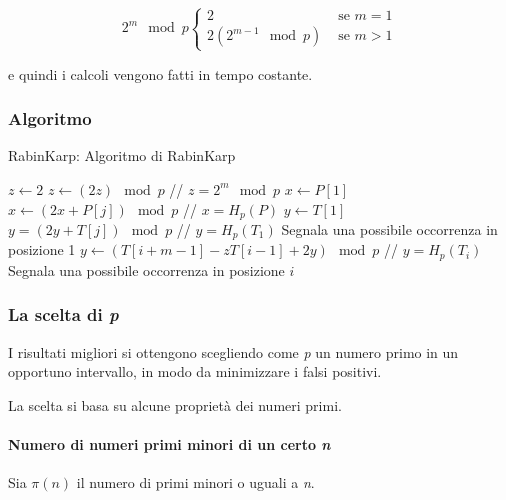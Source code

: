 $$
2^m \mod p  \begin{cases}
2 &\text{ se } m = 1\\
2 (2^{m-1} \mod p) & \text{ se } m > 1
\end{cases}
$$

e quindi i calcoli vengono fatti in tempo costante.

\subsubsection{Algoritmo}\label{algortimo}

\begin{breakablealgorithm}
	\caption{RabinKarp: Algoritmo di RabinKarp}
	\begin{algorithmic}[1]
    \State $z \gets 2$
        \State $ z \gets (2z) \mod p$
    \EndFor
    \State // $ z = 2^m \mod p$
    \State $ x \gets P[1]$
        \State $ x \gets (2x + P[j]) \mod p$
    \EndFor
    \State // $x = H_p(P)$
    \State $y \gets T[1]$
        \State $y = (2y + T[j]) \mod p$
    \EndFor
    \State // $y = H_p(T_1)$
        \State Segnala una possibile occorrenza in posizione 1
    \EndIf
        \State $y \gets (T[i+m-1] - zT[i-1] + 2y) \mod p$
        \State // $y = H_p(T_i)$
            \State Segnala una possibile occorrenza in posizione $i$
        \EndIf
    \EndFor
\EndFunction
\end{algorithmic}
\end{breakablealgorithm}

\subsubsection{La scelta di \textit{p}}\label{la-scelta-di-p}

I risultati migliori si ottengono scegliendo come \emph{p} un numero
primo in un opportuno intervallo, in modo da minimizzare i falsi
positivi.

La scelta si basa su alcune proprietà dei numeri primi.

\paragraph{Numero di numeri primi minori di un certo \emph{n}}

Sia $\pi(n)$ il numero di primi minori o uguali a \emph{n}.

